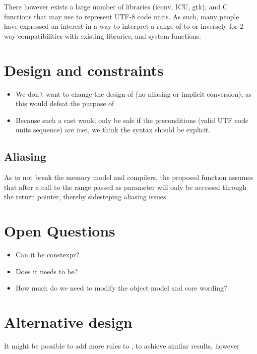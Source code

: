 \documentclass{wg21}
\begin{document}
There however exists a large number of libraries (iconv, ICU, gtk), and C functions that may use  to represent UTF-8 code units.
As such, many people have expressed an interest in a way to interpret a range of  to  or inversely for 2 way compatibilities with existing libraries, and system functions.

\section{Design and constraints}

\begin{itemize}
    \item We don't want to change the design of  (no aliasing or implicit conversion), as this would defeat the purpose of  
    \item Because such a cast would only be safe if the preconditions (valid UTF code units sequence) are met, we think the syntax should be explicit.
\end{itemize}

\subsection{Aliasing}

As to not break the memory model and compilers, the proposed function assumes that after a call to  the range passed as parameter will only be accessed
through the return pointer, thereby sidesteping aliasing issues.

\section{Open Questions}

\begin{itemize}
\item Can it be constexpr?
\item Does it needs to be?
\item How much do we need to modify the object model and core wording?
\end{itemize}


\section{Alternative design}

It might be possible to add more rules to , to achieve similar results, however
\end{document}

